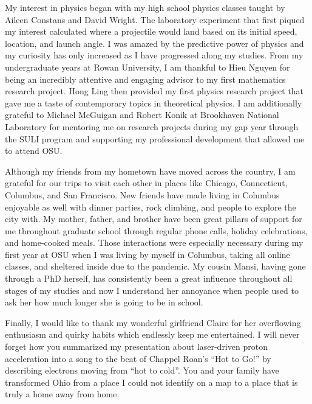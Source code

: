 \begin{acknowledgments}
My interest in physics began with my high school physics classes taught by Aileen Constans and David Wright. The laboratory experiment that first piqued my interest calculated where a projectile would land based on its initial speed, location, and launch angle. I was amazed by the predictive power of physics and my curiosity has only increased as I have progressed along my studies. From my undergraduate years at Rowan University, I am thankful to Hieu Nguyen for being an incredibly attentive and engaging advisor to my first mathematics research project. Hong Ling then provided my first physics research project that gave me a taste of contemporary topics in theoretical physics. I am additionally grateful to Michael McGuigan and Robert Konik at Brookhaven National Laboratory for mentoring me on research projects during my gap year through the SULI program and supporting my professional development that allowed me to attend OSU.

Although my friends from my hometown have moved across the country, I am grateful for our trips to visit each other in places like Chicago, Connecticut, Columbus, and San Francisco. New friends have made living in Columbus enjoyable as well with dinner parties, rock climbing, and people to explore the city with. My mother, father, and brother have been great pillars of support for me throughout graduate school through regular phone calls, holiday celebrations, and home-cooked meals. Those interactions were especially necessary during my first year at OSU when I was living by myself in Columbus, taking all online classes, and sheltered inside due to the pandemic. My cousin Mansi, having gone through a PhD herself, has consistently been a great influence throughout all stages of my studies and now I understand her annoyance when people used to ask her how much longer she is going to be in school.

Finally, I would like to thank my wonderful girlfriend Claire for her overflowing enthusiasm and quirky habits which endlessly keep me entertained. I will never forget how you summarized my presentation about laser-driven proton acceleration into a song to the beat of Chappel Roan's ``Hot to Go!'' by describing electrons moving from ``hot to cold''. You and your family have transformed Ohio from a place I could not identify on a map to a place that is truly a home away from home.
\end{acknowledgments}
